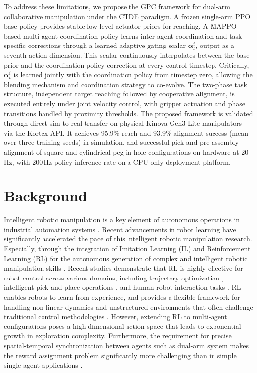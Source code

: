 \documentclass[a4paper,fleqn]{cas-dc}
\begin{document}
To address these limitations, we propose the GPC framework for dual-arm collaborative manipulation under the CTDE paradigm. A frozen single-arm PPO base policy provides stable low-level actuator priors for reaching. A MAPPO-based multi-agent coordination policy learns inter-agent coordination and task-specific corrections through a learned adaptive gating scalar $\mathbf{\alpha}^{i}_{t}$, output as a seventh action dimension. This scalar continuously interpolates between the base prior and the coordination policy correction at every control timestep. Critically, $\mathbf{\alpha}^{i}_{t}$ is learned jointly with the coordination policy from timestep zero, allowing the blending mechanism and coordination strategy to co-evolve. The two-phase task structure, independent target reaching followed by cooperative alignment, is executed entirely under joint velocity control, with gripper actuation and phase transitions handled by proximity thresholds. The proposed framework is validated through direct sim-to-real transfer on physical Kinova Gen3 Lite manipulators via the Kortex API. It achieves 95.9\% reach and 93.9\% alignment success (mean over three training seeds) in simulation, and successful pick-and-pre-assembly alignment of square and cylindrical peg-in-hole configurations on hardware at 20 Hz, with 200\,Hz policy inference rate on a CPU-only deployment platform.

\section{Background}
\label{related_work}
Intelligent robotic manipulation is a key element of autonomous operations in industrial automation systems \cite{surya2025iapf}. Recent advancements in robot learning have significantly accelerated the pace of this intelligent robotic manipulation research. Especially, through the integration of Imitation Learning (IL) and Reinforcement Learning (RL) for the autonomous generation of complex and intelligent robotic manipulation skills \cite{intro-3, related-29}. Recent studies demonstrate that RL is highly effective for robot control across various domains, including trajectory optimization \cite{related-30}, intelligent pick-and-place operations \cite{intro-15}, and human-robot interaction tasks \cite{related-33, intro-19}. RL enables robots to learn from experience, and provides a flexible framework for handling non-linear dynamics and unstructured environments that often challenge traditional control methodologies \cite{related-35}. However, extending RL to multi-agent configurations poses a high-dimensional action space that leads to exponential growth in exploration complexity. Furthermore, the requirement for precise spatial-temporal synchronization between agents such as dual-arm system makes the reward assignment problem significantly more challenging than in simple single-agent applications \cite{related-36}.     
\end{document}
